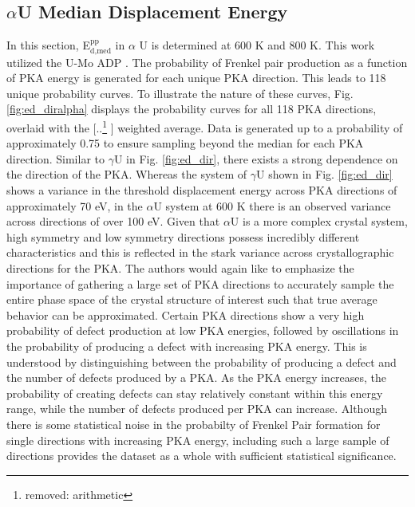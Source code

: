 \documentclass[review]{elsarticle}
\providecommand{\DIFaddtex}[1]{{\protect\color{blue} \sf #1}} %
\providecommand{\DIFdeltex}[1]{{\protect\color{red} [..\footnote{removed: #1} ]}} %
\providecommand{\DIFaddbegin}{} %
\providecommand{\DIFaddend}{} %
\providecommand{\DIFdelbegin}{} %
\providecommand{\DIFdelend}{} %
\providecommand{\DIFadd}[1]{\texorpdfstring{\DIFaddtex{#1}}{#1}} %
\providecommand{\DIFdel}[1]{\texorpdfstring{\DIFdeltex{#1}}{}} %
\newcommand{\DIFscaledelfig}{0.5}
\newlength{\DIFdelgraphicswidth} %
\newlength{\DIFdelgraphicsheight} %
\newcommand{\DIFaddincludegraphics}[2][]{{\color{blue}\fbox{\DIFOincludegraphics[#1]{#2}}}} %
\newcommand{\DIFdelincludegraphics}[2][]{%
\sbox{\DIFdelgraphicsbox}{\DIFOincludegraphics[#1]{#2}}%
\settoboxwidth{\DIFdelgraphicswidth}{\DIFdelgraphicsbox} %
\settoboxtotalheight{\DIFdelgraphicsheight}{\DIFdelgraphicsbox} %
\scalebox{\DIFscaledelfig}{%
\parbox[b]{\DIFdelgraphicswidth}{\usebox{\DIFdelgraphicsbox}\\[-\baselineskip] \rule{\DIFdelgraphicswidth}{0em}}\llap{\resizebox{\DIFdelgraphicswidth}{\DIFdelgraphicsheight}{%
\setlength{\unitlength}{\DIFdelgraphicswidth}%
\begin{picture}(1,1)%
\thicklines\linethickness{2pt} %
{\color[rgb]{1,0,0}\put(0,0){\framebox(1,1){}}}%
{\color[rgb]{1,0,0}\put(0,0){\line( 1,1){1}}}%
{\color[rgb]{1,0,0}\put(0,1){\line(1,-1){1}}}%
\end{picture}%
}\hspace*{3pt}}} %
} %
\DeclareRobustCommand{\DIFaddbegin}{\DIFOaddbegin \let\includegraphics\DIFaddincludegraphics} %
\DeclareRobustCommand{\DIFaddend}{\DIFOaddend \let\includegraphics\DIFOincludegraphics} %
\DeclareRobustCommand{\DIFdelbegin}{\DIFOdelbegin \let\includegraphics\DIFdelincludegraphics} %
\DeclareRobustCommand{\DIFdelend}{\DIFOaddend \let\includegraphics\DIFOincludegraphics} %
\begin{document}
\FloatBarrier

\subsection{$\alpha$U Median Displacement Energy}

In this section, E$^{\textrm{pp}}_{\textrm{d,med}}$ in $\alpha$ U is determined at 600 K and 800 K. This work utilized the U-Mo ADP \cite{smirnovaADP}. The probability of Frenkel pair production as a function of PKA energy is generated for each unique PKA direction. This leads to 118 unique probability curves. To illustrate the nature of these curves, Fig. \ref{fig:ed_diralpha} displays the probability curves for all 118 PKA directions, overlaid with the \DIFdelbegin \DIFdel{arithmetic }\DIFdelend \DIFaddbegin \DIFadd{weighted }\DIFaddend average. Data is generated up to a probability of approximately 0.75 to ensure sampling beyond the median for each PKA direction. Similar to $\gamma$U in Fig. \ref{fig:ed_dir}, there exists a strong dependence on the direction of the PKA. Whereas the system of $\gamma$U shown in Fig. \ref{fig:ed_dir} shows a variance in the threshold displacement energy across PKA directions of approximately 70 eV, in the $\alpha$U system at 600 K there is an observed variance across directions of over 100 eV. Given that $\alpha$U is a more complex crystal system, high symmetry and low symmetry directions possess incredibly different characteristics and this is reflected in the stark variance across crystallographic directions for the PKA. The authors would again like to emphasize the importance of gathering a large set of PKA directions to accurately sample the entire phase space of the crystal structure of interest such that true average behavior can be approximated. Certain PKA directions show a very high probability of defect production at low PKA energies, followed by oscillations in the probability of producing a defect with increasing PKA energy. This is understood by distinguishing between the probability of producing a defect and the number of defects produced by a PKA. As the PKA energy increases, the probability of creating defects can stay relatively constant within this energy range, while the number of defects produced per PKA can increase. Although there is some statistical noise in the probabilty of Frenkel Pair formation for single directions with increasing PKA energy, including such a large sample of directions provides the dataset as a whole with sufficient statistical significance. 
\end{document}
